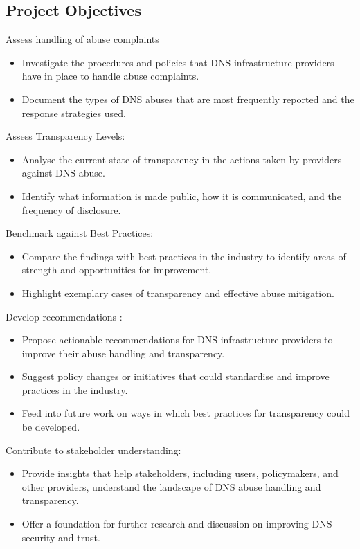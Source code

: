 \subsection{Project Objectives}

Assess handling of abuse complaints

\begin{itemize}
  \item Investigate the procedures and policies that DNS infrastructure providers have in place to handle abuse complaints.
  \item Document the types of DNS abuses that are most frequently reported and the response strategies used.
\end{itemize}

Assess Transparency Levels:

\begin{itemize}
  \item Analyse the current state of transparency in the actions taken by providers against DNS abuse.
  \item Identify what information is made public, how it is communicated, and the frequency of disclosure.
\end{itemize}

Benchmark against Best Practices:

\begin{itemize}
  \item Compare the findings with best practices in the industry to identify areas of strength and opportunities for improvement.
  \item Highlight exemplary cases of transparency and effective abuse mitigation.
\end{itemize}

Develop recommendations :

\begin{itemize}
  \item Propose actionable recommendations for DNS infrastructure providers to improve their abuse handling and transparency.
  \item Suggest policy changes or initiatives that could standardise and improve practices in the industry.
  \item Feed into future work on ways in which best practices for transparency could be developed.
\end{itemize}

Contribute to stakeholder understanding: 

\begin{itemize}
  \item Provide insights that help stakeholders, including users, policymakers, and other providers, understand the landscape of DNS abuse handling and transparency.
  \item Offer a foundation for further research and discussion on improving DNS security and trust.
\end{itemize}

